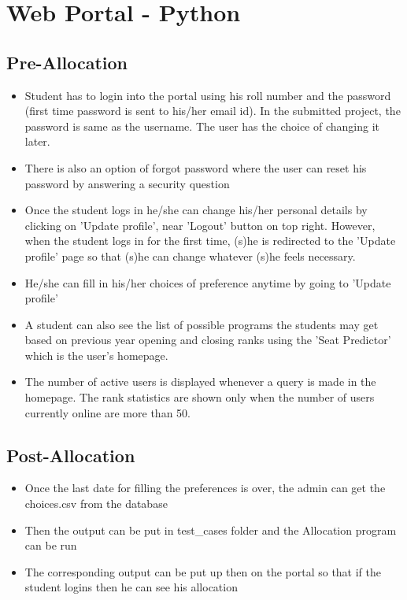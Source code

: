 \documentclass[]{report}
\begin{document}
\section{Web Portal - Python}
\subsection{Pre-Allocation}
\begin{itemize}
\item Student has to login into the portal using his roll number and the password (first time password is sent to his/her email id). In the submitted project, the password is same as the username. The user has the choice of changing it later.
\item There is also an option of forgot password where the user can reset his password by answering a security question
\item Once the student logs in he/she can change his/her personal details by clicking on 'Update profile', near 'Logout' button on top right. However, when the student logs in for the first time, (s)he is redirected to the 'Update profile' page so that (s)he can change whatever (s)he feels necessary.
\item He/she can fill in his/her choices of preference anytime by going to 'Update profile'
\item A student can also see the list of possible programs the students may get based on previous year opening and closing ranks using the 'Seat Predictor' which is the user's homepage.
\item The number of active users is displayed whenever a query is made in the homepage. The rank statistics are shown only when the number of users currently online are more than 50.
\end{itemize}

\subsection{Post-Allocation}
\begin{itemize}
\item Once the last date for filling the preferences is over, the admin can get the choices.csv from the database
\item Then the output can be put in test\_cases folder and the Allocation program can be run
\item The corresponding output can be put up then on the portal so that if the student logins then he can see his allocation
\end{itemize}
\end{document}
